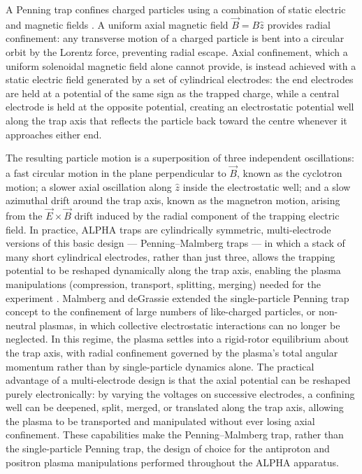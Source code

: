 A Penning trap confines charged particles using a combination of static electric and magnetic fields \cite{DEHMELT196853,BrownGabrielse:1986geo}. A uniform axial magnetic field  $\vec{B} = B \hat{z}$ provides radial confinement: any transverse motion of a charged particle is bent into a circular orbit by the Lorentz force, preventing radial escape. Axial confinement, which a uniform solenoidal magnetic field alone cannot provide, is instead achieved with a static electric field generated by a set of cylindrical electrodes: the end electrodes are held at a potential of the same sign as the trapped charge, while a central electrode is held at the opposite potential, creating an electrostatic potential well along the trap axis that reflects the particle back toward the centre whenever it approaches either end.

The resulting particle motion is a superposition of three independent oscillations: a fast circular motion in the plane perpendicular to $\vec{B}$, known as the cyclotron motion; a slower axial oscillation along $\hat{z}$ inside the electrostatic well; and a slow azimuthal drift around the trap axis, known as the magnetron motion, arising from the $\vec{E} \times \vec{B}$ drift induced by the radial component of the trapping electric field. In practice, ALPHA traps are cylindrically symmetric, multi-electrode versions of this basic design — Penning--Malmberg traps — in which a stack of many short cylindrical electrodes, rather than just three, allows the trapping potential to be reshaped dynamically along the trap axis, enabling the plasma manipulations (compression, transport, splitting, merging) needed for the experiment \cite{Ahmadi:2018enh}.
Malmberg and deGrassie \cite{PhysRevLett.35.577} extended the single-particle Penning trap concept to the confinement of large numbers of like-charged particles, or non-neutral plasmas, in which collective electrostatic interactions can no longer be neglected. In this regime, the plasma settles into a rigid-rotor equilibrium about the trap axis, with radial confinement governed by the plasma's total angular momentum rather than by single-particle dynamics alone. The practical advantage of a multi-electrode design is that the axial potential can be reshaped purely electronically: by varying the voltages on successive electrodes, a confining well can be deepened, split, merged, or translated along the trap axis, allowing the plasma to be transported and manipulated without ever losing axial confinement. These capabilities make the Penning--Malmberg trap, rather than the single-particle Penning trap, the design of choice for the antiproton and positron plasma manipulations performed throughout the ALPHA apparatus.

